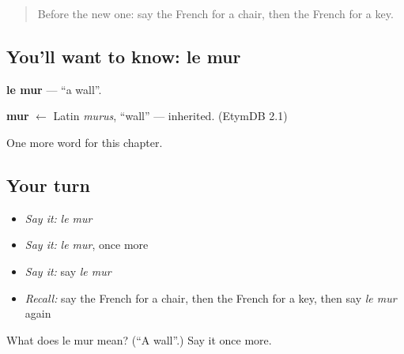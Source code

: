 \label{lesson:FR-C73-mur}



\begin{quote}
Before the new one: say the French for a chair, then the French for a key.
\end{quote}

\subsection*{You'll want to know: le mur}
\textbf{le mur} — \textquotedblleft{}a wall\textquotedblright{}.

\begin{cousinweb}
\textbf{mur} $\leftarrow$ Latin \emph{murus}, \textquotedblleft{}wall\textquotedblright{} — inherited. (EtymDB 2.1)
\end{cousinweb}

\begin{grammarlens}[title={What you've built}]
One more word for this chapter.
\end{grammarlens}

\subsection*{Your turn}
\begin{itemize}
\raggedright
  \item \emph{Say it:} \emph{le mur}
  \item \emph{Say it:} \emph{le mur}, once more
  \item \emph{Say it:} say \emph{le mur}
  \item \emph{Recall:} say the French for a chair, then the French for a key, then say \emph{le mur} again
\end{itemize}

\begin{tcolorbox}[breakable,colback=teal!4,colframe=teal!35!black,title={Before you move on}]
What does le mur mean? (\textquotedblleft{}A wall\textquotedblright{}.) Say it once more.
\end{tcolorbox}
